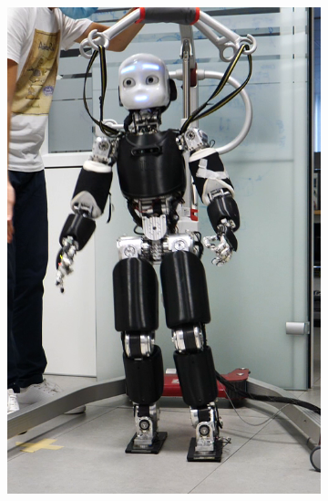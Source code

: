 \begin{figure}[!t]
\begin{subfigure}[b]{0.32\textwidth}
        \includegraphics[width=\columnwidth]{chapter_centroidal_mpc/figures/icub3.png}
    \end{subfigure}
    \vskip 0.25cm
            \begin{subfigure}[b]{0.32\textwidth}
        \centering

\end{subfigure}
\end{figure}
